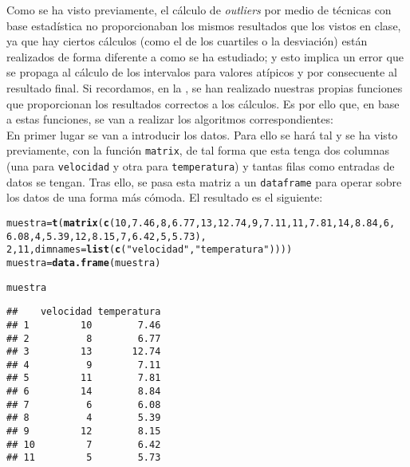 \documentclass[12pt]{report}\usepackage[]{graphicx}\usepackage[dvipsnames]{xcolor}
\makeatletter
\newcommand{\hlnum}[1]{\textcolor[rgb]{0.686,0.059,0.569}{#1}}%
\newcommand{\hlstr}[1]{\textcolor[rgb]{0.192,0.494,0.8}{#1}}%
\newcommand{\hlstd}[1]{\textcolor[rgb]{0.345,0.345,0.345}{#1}}%
\newcommand{\hlkwb}[1]{\textcolor[rgb]{0.69,0.353,0.396}{#1}}%
\newcommand{\hlkwc}[1]{\textcolor[rgb]{0.333,0.667,0.333}{#1}}%
\newcommand{\hlkwd}[1]{\textcolor[rgb]{0.737,0.353,0.396}{\textbf{#1}}}%
\newenvironment{kframe}{%
 \def\at@end@of@kframe{}%
 \ifinner\ifhmode%
  \def\at@end@of@kframe{\end{minipage}}%
  \begin{minipage}{\columnwidth}%
 \fi\fi%
 \def\FrameCommand##1{\hskip\@totalleftmargin \hskip-\fboxsep
 \colorbox{shadecolor}{##1}\hskip-\fboxsep
     \hskip-\linewidth \hskip-\@totalleftmargin \hskip\columnwidth}%
 \MakeFramed {\advance\hsize-\width
   \@totalleftmargin\z@ \linewidth\hsize
   \@setminipage}}%
 {\par\unskip\endMakeFramed%
 \at@end@of@kframe}
\newenvironment{knitrout}{}{} %
\makeatother
\begin{document}
				Como se ha visto previamente, el cálculo de \textit{outliers} por medio de técnicas con base estadística no proporcionaban los mismos resultados que los vistos en clase, ya que hay ciertos cálculos (como el de los cuartiles o la desviación) están realizados de forma diferente a como se ha estudiado; y esto implica un error que se propaga al cálculo de los intervalos para valores atípicos y por consecuente al resultado final.  Si recordamos, en la , se han realizado nuestras propias funciones que proporcionan los resultados correctos a los cálculos. Es por ello que, en base a estas funciones, se van a realizar los algoritmos correspondientes:\\
				
				En primer lugar se van a introducir los datos. Para ello se hará tal y se ha visto previamente, con la función \texttt{matrix}, de tal forma que esta tenga dos columnas (una para \texttt{velocidad} y otra para \texttt{temperatura}) y tantas filas como entradas de datos se tengan. Tras ello, se pasa esta matriz a un \texttt{dataframe} para operar sobre los datos de una forma más cómoda. El resultado es el siguiente: 
				
\begin{knitrout}
\color{fgcolor}\begin{kframe}
\begin{alltt}
\hlstd{muestra} \hlkwb{=} \hlkwd{t}\hlstd{(}\hlkwd{matrix}\hlstd{(}\hlkwd{c}\hlstd{(}\hlnum{10}\hlstd{,}\hlnum{7.46}\hlstd{,}\hlnum{8}\hlstd{,}\hlnum{6.77}\hlstd{,}\hlnum{13}\hlstd{,}\hlnum{12.74}\hlstd{,}\hlnum{9}\hlstd{,}\hlnum{7.11}\hlstd{,}\hlnum{11}\hlstd{,}\hlnum{7.81}\hlstd{,}\hlnum{14}\hlstd{,}\hlnum{8.84}\hlstd{,}\hlnum{6}\hlstd{,}
\hlnum{6.08}\hlstd{,}\hlnum{4}\hlstd{,}\hlnum{5.39}\hlstd{,}\hlnum{12}\hlstd{,}\hlnum{8.15}\hlstd{,}\hlnum{7}\hlstd{,}\hlnum{6.42}\hlstd{,}\hlnum{5}\hlstd{,}\hlnum{5.73}\hlstd{),}
\hlnum{2}\hlstd{,}\hlnum{11}\hlstd{,}\hlkwc{dimnames}\hlstd{=}\hlkwd{list}\hlstd{(}\hlkwd{c}\hlstd{(}\hlstr{"velocidad"}\hlstd{,}\hlstr{"temperatura"}\hlstd{))))}
\hlstd{muestra}\hlkwb{=}\hlkwd{data.frame}\hlstd{(muestra)}

\hlstd{muestra}
\end{alltt}
\begin{verbatim}
##    velocidad temperatura
## 1         10        7.46
## 2          8        6.77
## 3         13       12.74
## 4          9        7.11
## 5         11        7.81
## 6         14        8.84
## 7          6        6.08
## 8          4        5.39
## 9         12        8.15
## 10         7        6.42
## 11         5        5.73
\end{verbatim}
\end{kframe}
\end{knitrout}
				
\end{document}
